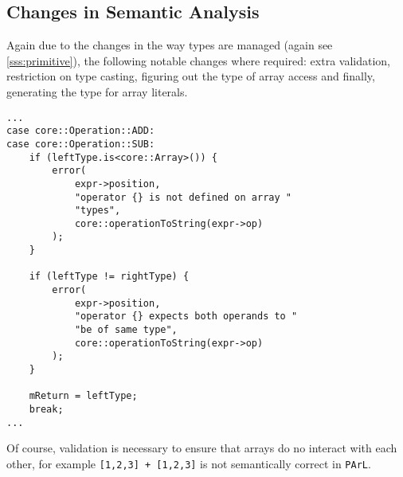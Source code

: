 \subsection{Changes in Semantic Analysis}

Again due to the changes in the way types are managed (again see
\ref{sss:primitive}), the following notable changes where
required: extra validation, restriction on type casting,
figuring out the type of array access and finally, generating
the type for array literals.

\begin{lstlisting}[caption={A part of the \texttt{visit(Binary
*)} method in the \texttt{AnalysisVisitor} class
(analysis/AnalysisVisitor.cpp).}]
...
case core::Operation::ADD:
case core::Operation::SUB:
    if (leftType.is<core::Array>()) {
        error(
            expr->position,
            "operator {} is not defined on array "
            "types",
            core::operationToString(expr->op)
        );
    }

    if (leftType != rightType) {
        error(
            expr->position,
            "operator {} expects both operands to "
            "be of same type",
            core::operationToString(expr->op)
        );
    }

    mReturn = leftType;
    break;
...
\end{lstlisting}

Of course, validation is necessary to ensure that arrays do no
interact with each other, for example \texttt{[1,2,3] + [1,2,3]}
is not semantically correct in \texttt{PArL}.

